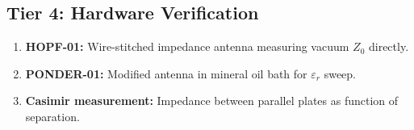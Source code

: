 \subsection{Tier 4: Hardware Verification}
\begin{enumerate}
    \item \textbf{HOPF-01:} Wire-stitched impedance antenna measuring
    vacuum $Z_0$ directly.
    \item \textbf{PONDER-01:} Modified antenna in mineral oil bath
    for $\varepsilon_r$ sweep.
    \item \textbf{Casimir measurement:} Impedance between parallel
    plates as function of separation.
\end{enumerate}
